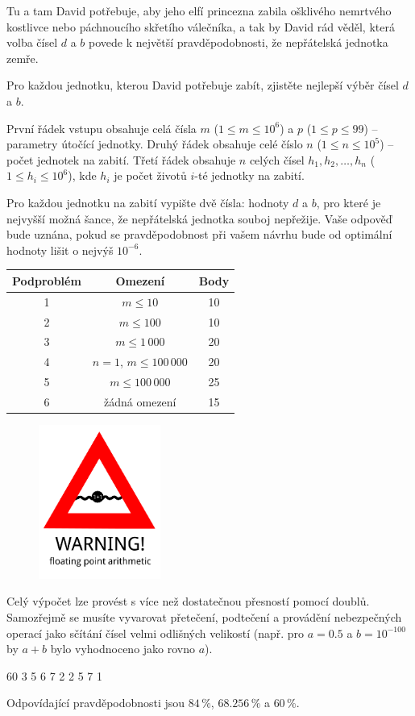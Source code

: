 Tu a tam David potřebuje, aby jeho elfí princezna zabila ošklivého nemrtvého kostlivce nebo páchnoucího skřetího válečníka,
a tak by David rád věděl, která volba čísel $d$ a $b$ povede k největší pravděpodobnosti, že nepřátelská jednotka zemře.


Pro každou jednotku, kterou David potřebuje zabít, zjistěte nejlepší výběr čísel $d$ a $b$.


První řádek vstupu obsahuje celá čísla $m$ ($1\leq m\leq 10^6$)
a $p$ ($1\leq p\leq 99$) -- parametry útočící jednotky.
Druhý řádek obsahuje celé číslo $n$ ($1\leq n\leq 10^5$) -- počet jednotek na zabití.
Třetí řádek obsahuje $n$ celých čísel $h_1,h_2,\dots,h_n$ ($1\leq h_i\leq 10^6$),
kde $h_i$ je počet životů $i$-té jednotky na zabití.



Pro každou jednotku na zabití vypište dvě čísla: hodnoty $d$ a $b$, pro které je nejvyšší možná
šance, že nepřátelská jednotka souboj nepřežije. Vaše odpověď bude uznána, pokud se pravděpodobnost
při vašem návrhu bude od optimální hodnoty lišit o nejvýš $10^{-6}$.


\begin{tabular}{|c|c|c|}
	\hline
	Podproblém & Omezení  & Body \\
	\hline
	1 & $m \leq 10$ & 10 \\
	\hline
	2 & $m \leq 100$ & 10 \\
	\hline
	3 & $m \leq 1\,000$ & 20 \\
	\hline
	4 & $n=1$, $m\leq 100\,000$ & 20 \\
	\hline
	5 & $m \leq 100\,000$ & 25 \\
	\hline
	6 & žádná omezení & 15 \\
	\hline
\end{tabular}


\newpage
\begin{figure}
\includegraphics[width=4cm]{img/wesnoth_warning}
\end{figure}
\bigskip
\bigskip
Celý výpočet lze provést s více než dostatečnou přesností pomocí doublů.
Samozřejmě se musíte vyvarovat přetečení, podtečení a provádění nebezpečných operací
jako sčítání čísel velmi odlišných velikostí (např. pro $a=0.5$ a $b=10^{-100}$
by $a+b$ bylo vyhodnoceno jako rovno $a$).
\bigskip
\bigskip
\bigskip
\bigskip


 60
3
5 6 7
 2
2 5
7 1

\sampleEND

Odpovídající pravděpodobnosti jsou $84\,\%$, $68.256\,\%$ a $60\,\%$.

